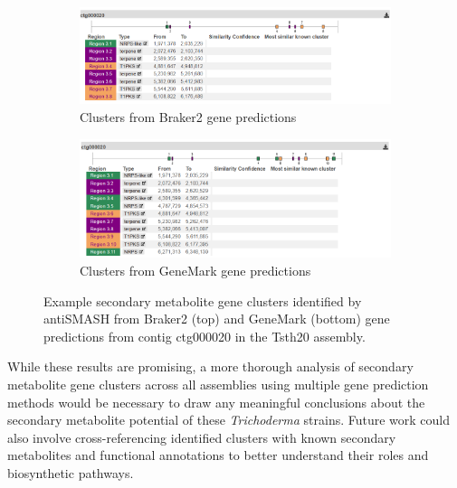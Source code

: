 \begin{figure}
  \centering
  \begin{subfigure}{0.90\textwidth}
    \centering
    \includegraphics[width=\textwidth]{figures/braker-antismash-tsth20.png}
    \caption{Clusters from Braker2 gene predictions}
  \end{subfigure}
  \begin{subfigure}{0.9\textwidth}
    \centering
    \includegraphics[width=\textwidth]{figures/genemark-antismash-tsth20.png}
    \caption{Clusters from GeneMark gene predictions}
  \end{subfigure}
  \caption[Example Secondary Metabolite Gene Clusters Identified by antiSMASH]{Example secondary metabolite gene clusters identified by antiSMASH from Braker2 (top) and GeneMark (bottom) gene predictions from contig ctg000020 in the Tsth20 assembly.}\label{fig:antismash-clusters}
\end{figure}

While these results are promising, a more thorough analysis of secondary metabolite gene clusters across all assemblies using multiple gene prediction methods would be necessary to draw any meaningful conclusions about the secondary metabolite potential of these \textit{Trichoderma} strains. Future work could also involve cross-referencing identified clusters with known secondary metabolites and functional annotations to better understand their roles and biosynthetic pathways.